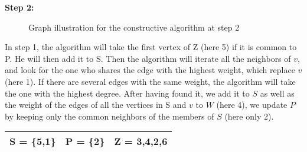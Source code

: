     \begin{minipage}{\linewidth}
        \textbf{Step 2:} \newline
        \begin{minipage}{0.4\textwidth}
            \begin{figure}[H]
                \centering
                \caption{Graph illustration for the constructive algorithm at step 2}
                \label{fig:constructive-mewc-edge-step2}
            \end{figure}
        \end{minipage}
        \begin{minipage}{0.6\textwidth}
            In step 1, the algorithm will take the first vertex of Z (here 5) if it is common to P. He will then add it to S. 
            Then the algorithm will iterate all the neighbors of $v$, and look for the one who shares the edge with the highest weight, which replace $v$ (here 1). If there are several edges with the same weight, the algorithm will take the one with the highest degree. After having found it, we add it to $S$ as well as the weight of the edges of all the vertices in S and $v$ to $W$ (here 4), we update $P$ by keeping only the common neighbors of the members of $S$ (here only 2).
    
            \begin{center}
                \begin{tabular}{|lll|}
                    \hline
                    S = \{5,1\} & P = \{2\} & Z = {3,4,2,6} \\
                    \hline
                \end{tabular}
            \end{center}
        \end{minipage}
    \end{minipage}

